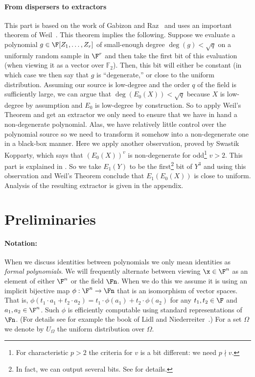 \paragraph{From dispersers to extractors}
This part is based on the work of Gabizon and Raz~\cite{GR08} and uses
%
an important theorem of Weil~\cite{Weil48}.
This theorem implies the following. Suppose we evaluate a polynomial $g\in \F[Z_1,\ldots,Z_r]$ of small-enough degree $\deg(g)<\sqrt q $
on a uniformly random sample in $\F^r$ and then take the first bit of this evaluation (when viewing it as a vector over $\mathbb{F}_2$).
%
%
%
Then, this bit will either be constant (in which case we then say
%
%
that $g$ is ``degenerate,'' or close to the uniform distribution.
%
 Assuming our source is low-degree and the
%
%
order $q$ of the field
is sufficiently large, we %
can argue that $\deg(E_0(X))<\sqrt q$ because $X$ is
low-degree by assumption and $E_0$ is low-degree by construction. So to apply Weil's Theorem and get an extractor we only need to ensure that we have in hand
a non-degenerate polynomial. Alas, we have relatively little control over the polynomial source so
we %
need to transform it somehow into a non-degenerate one in a
 black-box manner.
Here we apply another observation,
%
%
proved by Swastik Kopparty,
which says that $(E_0(X))^v$ is non-degenerate for
odd\footnote{For characteristic $p>2$ the criteria for $v$ is a bit different:
we need
%
$p\nmid v$.} $v>2$.
 This part is explained in . So we take $E_1(Y)$ to be the first\footnote{In fact, we can  output several bits. See  for details.}  bit of $Y^3$ and using this observation and Weil's Theorem conclude
 that $E_1(E_0(X))$ is close to uniform. Analysis of the resulting extractor is given in the appendix.

\section{Preliminaries}\label{sec-prelim}
\paragraph{Notation:}
When we discuss identities between polynomials we
only mean identities as \emph{formal polynomials}.
We will frequently alternate between viewing $\x\in \F^n$ as an element of
either $\F^n$ or the field $\Fn$.
When we do this we assume it is using an implicit bijective map $\phi:\F^n\to \Fn$ that is
an isomorphism of vector spaces.
That is, $\phi(t_1\cdot a_1+t_2\cdot a_2)= t_1\cdot \phi(a_1) + t_2\cdot \phi(a_2)$
for any $t_1,t_2\in \F$ and $a_1,a_2\in \F^n$.
Such $\phi$ is efficiently computable using standard representations of $\Fn$.
(For details see for example the book of Lidl and Niederreiter~\cite{LN94}.)
For a set $\Omega$ we denote by $U_{\Omega}$ the uniform distribution
%
over $\Omega$.

